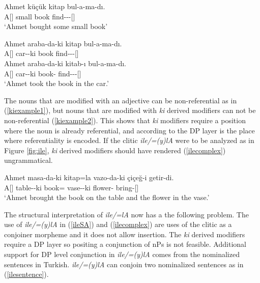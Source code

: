 \begin{exe}
\ex \label{kiexample}
    \begin{xlist}
    \ex \label{kiexample1}
    \gll Ahmet küçük kitap bul-a-ma-dı. \\
    A[{\Nom}] small book find-{\Abil}-{\Neg}-{\Pst}[{\Tsg}] \\ 
    \glt `Ahmet bought some small book'

    \ex \label{kiexample2}
    \gll *Ahmet araba-da-ki kitap bul-a-ma-dı. \\ 
    A[{\Nom}] car-{\Loc}-ki book find-{\Abil}-{\Neg}-{\Pst}[{\Tsg}] \\
    
    \ex \label{kiexample3}
    \gll Ahmet araba-da-ki kitab-ı bul-a-ma-dı. \\ 
    A[{\Nom}] car-{\Loc}-ki book-{\Acc} find-{\Abil}-{\Neg}-{\Pst}[{\Tsg}] \\
\glt `Ahmet took the book in the car.'
\end{xlist}
\end{exe}

The nouns that are modified with an adjective can be non-referential as in (\ref{kiexample1}), but nouns that are modified with \textit{ki} derived modifiers can not be non-referential (\ref{kiexample2}). This shows that \textit{ki} modifiers require a position where the noun is already referential, and according to \cite{ozturk2002turkish} the DP layer is the place where referentiality is encoded. If the clitic \textit{ile/=(y)lA} were to be analyzed as in Figure \ref{fig:ile}, \textit{ki} derived modifiers should have rendered (\ref{ilecomplex}) ungrammatical.

\begin{exe}
\ex \label{ilecomplex} 
\gll Ahmet masa-da-ki kitap=la vazo-da-ki çiçeğ-i getir-di. \\
A[{\Nom}] table-{\Loc}-ki book={\And} vase-{\Loc}-ki flower-{\Acc} bring-{\Pst}[{\Tsg}] \\
\glt`Ahmet brought the book on the table and the flower in the vase.'
\end{exe}

The structural interpretation of \textit{ile/=lA} now has a the following problem. The use of \textit{ile/=(y)lA} in (\ref{ileSA}) and (\ref{ilecomplex}) are uses of the clitic as a conjoiner morpheme and it does not allow {\Case} insertion. The \textit{ki} derived modifiers require a DP layer so positing a conjunction of nPs is not feasible. Additional support for DP level conjunction in \textit{ile/=(y)lA} comes from the nominalized sentences in Turkish. \textit{ile/=(y)lA} can conjoin two nominalized sentences as in (\ref{ilesentence}).

